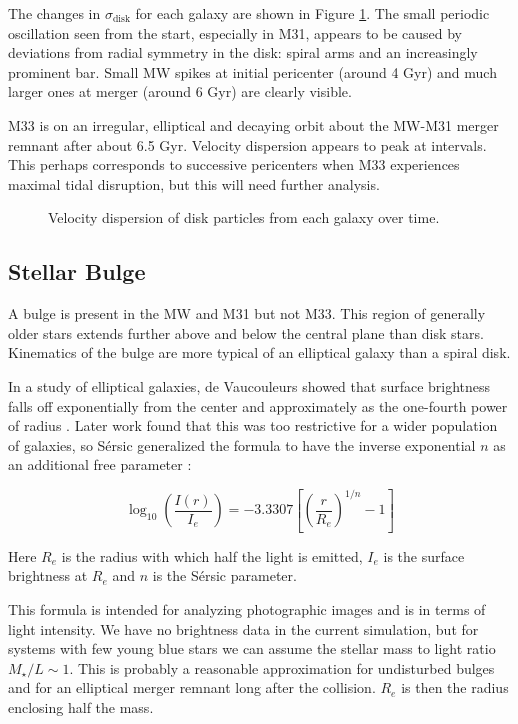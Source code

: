 \documentclass[twocolumn]{aastex63}
\begin{document}
The changes in $\sigma_{\text{disk}}$ for each galaxy are shown in Figure \ref{fig:vel_disp}. The small periodic oscillation seen from the start, especially in M31, appears to be caused by deviations from radial symmetry in the disk: spiral arms and an increasingly prominent bar. Small MW spikes at initial pericenter (around 4 Gyr) and much larger ones at merger (around 6 Gyr) are clearly visible.

M33 is on an irregular, elliptical and decaying orbit about the MW-M31 merger remnant after about 6.5 Gyr. Velocity dispersion appears to peak at intervals. This perhaps corresponds to successive pericenters when M33 experiences maximal tidal disruption, but this will need further analysis.

\begin{figure}[htb!]
	\caption{Velocity dispersion of disk particles from each galaxy over time.
		\label{fig:vel_disp}}
\end{figure}


\subsection{Stellar Bulge}

A bulge is present in the MW and M31 but not M33. This region of generally older stars extends further above and below the central plane than disk stars. Kinematics of the bulge are more typical of an elliptical galaxy than a spiral disk.

In a study of elliptical galaxies, de Vaucouleurs showed that surface brightness falls off exponentially from the center and approximately as the one-fourth power of radius \citep{de_vaucouleurs_recherches_1948}. Later work found that this was too restrictive for a wider population of galaxies, so Sérsic generalized the formula to have the inverse exponential $n$ as an additional free parameter \citep{sersic_influence_1963}:

\[ \log_{10} \left( \frac{I(r)}{I_e} \right) =  -3.3307 \left[ \left( \frac{r}{R_e} \right)^{1/n} - 1 \right] \]

Here $R_e$ is the radius with which half the light is emitted,  $I_e$ is the surface brightness at $R_e$ and $n$ is the Sérsic parameter.

This formula is intended for analyzing photographic images and is in terms of light intensity. We have no brightness data in the current simulation, but for systems with few young blue stars we can assume the stellar mass to light ratio $M_\star/L \sim 1$. This is probably a reasonable approximation for undisturbed bulges and for an elliptical merger remnant long after the collision. $R_e$ is then the radius enclosing half the mass.
\end{document}
